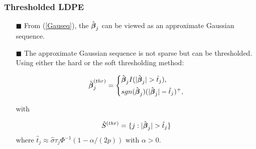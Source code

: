 \begin{frame}
\frametitle{Thresholded LDPE}
\begin{itemize}
\item[$\blacksquare$] From (\ref{Gauseq}), the $\hat{\mbox{\boldmath $\beta$}}_{j}$ can be viewed as an approximate Gaussian sequence.
\item[$\blacksquare$] The approximate Gaussian sequence is not sparse but can be thresholded. Using either the hard or the soft thresholding method:

\begin{scriptsize}
    \begin{equation} \label{TLDPE}
    \hat{\bbeta}^{(thr)}_{j}=
    \left\{
            \begin{aligned}%
            & \hat{\bbeta}_{j} I(|\hat{\bbeta}_{j}|>\hat{t}_{j}),   \\
            & sgn(\hat{\bbeta}_{j})(|\hat{\bbeta}_{j}|-\hat{t}_{j})^{+}, \\
            \end{aligned}
    \right.
    \end{equation}
\end{scriptsize}
with
\begin{scriptsize}
    \begin{equation*}
    \hat{S}^{(thr)}=\{j:|\hat{\bbeta}_{j}|>\hat{t}_{j}\}
    \end{equation*}
    where $\hat{t}_j \approx \hat{\sigma}\tau_j\Phi^{-1}(1-\alpha/(2p))$ with $\alpha>0$.
\end{scriptsize}
\end{itemize}
\end{frame}



